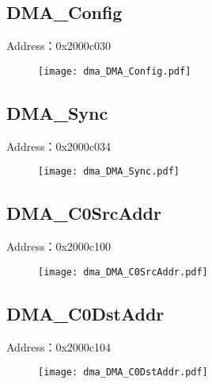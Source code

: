\subsection{DMA\_Config}
\label{dma-DMA-Config}
Address：0x2000c030
 \begin{figure}[H]
\texttt{[image: dma\_DMA\_Config.pdf]}
\end{figure}

\subsection{DMA\_Sync}
\label{dma-DMA-Sync}
Address：0x2000c034
 \begin{figure}[H]
\texttt{[image: dma\_DMA\_Sync.pdf]}
\end{figure}

\subsection{DMA\_C0SrcAddr}
\label{dma-DMA-C0SrcAddr}
Address：0x2000c100
 \begin{figure}[H]
\texttt{[image: dma\_DMA\_C0SrcAddr.pdf]}
\end{figure}

\subsection{DMA\_C0DstAddr}
\label{dma-DMA-C0DstAddr}
Address：0x2000c104
 \begin{figure}[H]
\texttt{[image: dma\_DMA\_C0DstAddr.pdf]}
\end{figure}

